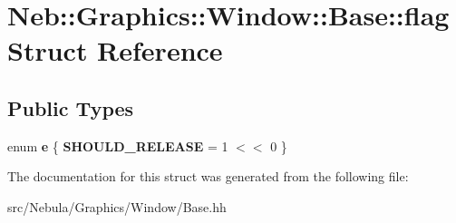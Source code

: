 \hypertarget{structNeb_1_1Graphics_1_1Window_1_1Base_1_1flag}{\section{Neb\-:\-:Graphics\-:\-:Window\-:\-:Base\-:\-:flag Struct Reference}
\label{structNeb_1_1Graphics_1_1Window_1_1Base_1_1flag}
}
\subsection*{Public Types}
\begin{DoxyCompactItemize}
\item 
enum {\bfseries e} \{ {\bfseries S\-H\-O\-U\-L\-D\-\_\-\-R\-E\-L\-E\-A\-S\-E} = 1 $<$$<$ 0
 \}
\end{DoxyCompactItemize}


The documentation for this struct was generated from the following file\-:\begin{DoxyCompactItemize}
\item 
src/\-Nebula/\-Graphics/\-Window/Base.\-hh\end{DoxyCompactItemize}
